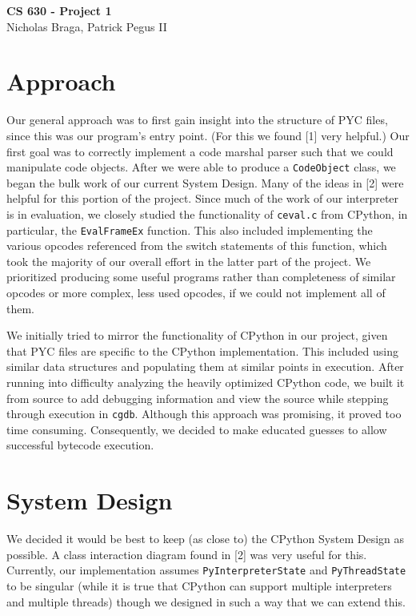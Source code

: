 \documentclass{article}
\begin{document}
\begin{center}
{\LARGE \bf CS 630 - Project 1}\\
\vspace*{0.1cm}
{\normalsize Nicholas Braga, Patrick Pegus II}
\end{center}

\section*{Approach}

Our general approach was to first gain insight into the structure of PYC files, since this was our program's entry point. (For this we found [1] very helpful.) Our first goal was to correctly implement a code marshal parser such that we could manipulate code objects. After we were able to produce a \texttt{CodeObject} class, we began the bulk work of our current System Design. Many of the ideas in [2] were helpful for this portion of the project. Since much of the work of our interpreter is in evaluation, we closely studied the functionality of \texttt{ceval.c} from CPython, in particular, the \texttt{EvalFrameEx} function.
This also included implementing the various opcodes referenced from the switch statements of this function, which took the majority of our overall effort in the latter part of the project. We prioritized producing some useful programs rather than completeness of similar opcodes or more complex, less used opcodes, if we could not implement all of them.

We initially tried to mirror the functionality of CPython in our project, given that PYC files are specific to the CPython implementation. This included using similar data structures and populating
them at similar points in execution. After running into difficulty analyzing the heavily optimized CPython code, we built it from source to add debugging information and view the source while stepping through execution
in \texttt{cgdb}. Although this approach was promising, it proved too time consuming. Consequently, we decided to make educated guesses to allow successful bytecode execution.

\section*{System Design}

We decided it would be best to keep (as close to) the CPython System Design as possible. A class interaction diagram found in [2] was very useful for this. Currently, our implementation assumes \texttt{PyInterpreterState} and \texttt{PyThreadState} to be singular (while it is true that CPython can support multiple interpreters and multiple threads) though we designed in such a way that we can extend this. 
\end{document}
